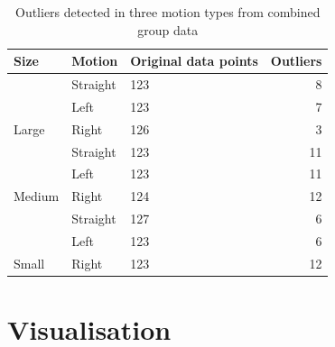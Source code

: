     
 
\begin{table}[]
\centering
\begin{tabular}{|l|l|l|r|}
\hline
\textbf{Size} & \textbf{Motion} & \textbf{Original data points} & \textbf{Outliers} \\ \hline
                                      & Straight                                & 123                                                   & 8                 \\ \cline{2-4} 
                                      & Left                                    & 123                                                   & 7                 \\ \cline{2-4} 
\multirow{-3}{*}{Large}               & Right                                   & 126                                                   & 3                 \\ \hline
                                      & Straight                                & 123                                                   & 11                \\ \cline{2-4} 
                                      & Left                                    & 123                                                   & 11                \\ \cline{2-4} 
\multirow{-3}{*}{Medium}              & Right                                   & 124                                                   & 12                \\ \hline
                                      & Straight                                & 127                                                   & 6                 \\ \cline{2-4} 
                                      & Left                                    & 123                                                   & 6                 \\ \cline{2-4} 
\multirow{-3}{*}{Small}               & Right                                   & 123                                                   & 12                \\ \hline
\end{tabular}
\caption{Outliers detected in three motion types from combined group data}
\label{tab:outliers_chapter5}
\end{table}
   

  
    \section{Visualisation}
    
